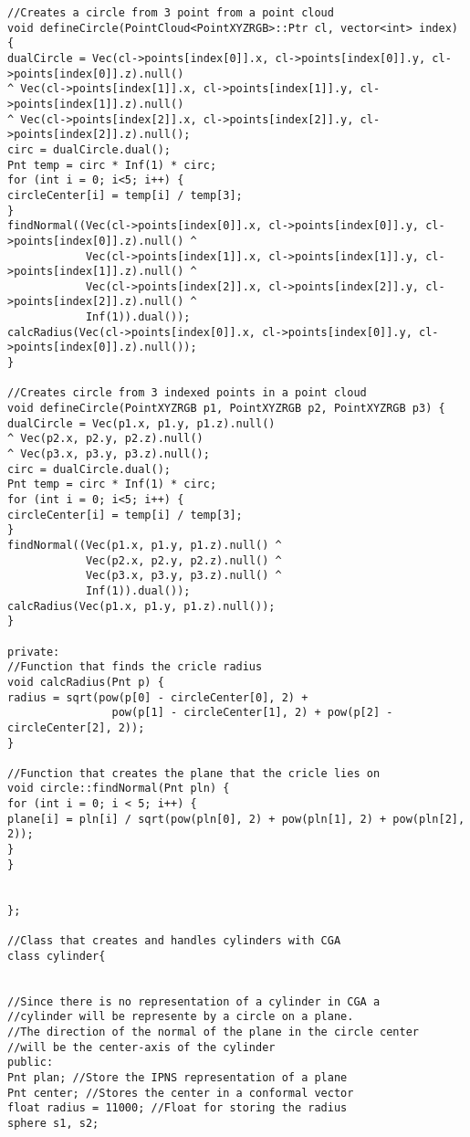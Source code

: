 {\begin{lstlisting}[caption={Archivo objects.h}]
//Creates a circle from 3 point from a point cloud
void defineCircle(PointCloud<PointXYZRGB>::Ptr cl, vector<int> index) {
dualCircle = Vec(cl->points[index[0]].x, cl->points[index[0]].y, cl->points[index[0]].z).null()
^ Vec(cl->points[index[1]].x, cl->points[index[1]].y, cl->points[index[1]].z).null()
^ Vec(cl->points[index[2]].x, cl->points[index[2]].y, cl->points[index[2]].z).null();
circ = dualCircle.dual();
Pnt temp = circ * Inf(1) * circ;
for (int i = 0; i<5; i++) {
circleCenter[i] = temp[i] / temp[3];
}
findNormal((Vec(cl->points[index[0]].x, cl->points[index[0]].y, cl->points[index[0]].z).null() ^ 
			Vec(cl->points[index[1]].x, cl->points[index[1]].y, cl->points[index[1]].z).null() ^
			Vec(cl->points[index[2]].x, cl->points[index[2]].y, cl->points[index[2]].z).null() ^
			Inf(1)).dual());
calcRadius(Vec(cl->points[index[0]].x, cl->points[index[0]].y, cl->points[index[0]].z).null());
}

//Creates circle from 3 indexed points in a point cloud
void defineCircle(PointXYZRGB p1, PointXYZRGB p2, PointXYZRGB p3) {
dualCircle = Vec(p1.x, p1.y, p1.z).null()
^ Vec(p2.x, p2.y, p2.z).null()
^ Vec(p3.x, p3.y, p3.z).null();
circ = dualCircle.dual();
Pnt temp = circ * Inf(1) * circ;
for (int i = 0; i<5; i++) {
circleCenter[i] = temp[i] / temp[3];
}
findNormal((Vec(p1.x, p1.y, p1.z).null() ^ 
			Vec(p2.x, p2.y, p2.z).null() ^ 
			Vec(p3.x, p3.y, p3.z).null() ^ 
			Inf(1)).dual());
calcRadius(Vec(p1.x, p1.y, p1.z).null());
}

private:
//Function that finds the cricle radius
void calcRadius(Pnt p) {
radius = sqrt(pow(p[0] - circleCenter[0], 2) + 
				pow(p[1] - circleCenter[1], 2) + pow(p[2] - circleCenter[2], 2));
}

//Function that creates the plane that the cricle lies on
void circle::findNormal(Pnt pln) {
for (int i = 0; i < 5; i++) {
plane[i] = pln[i] / sqrt(pow(pln[0], 2) + pow(pln[1], 2) + pow(pln[2], 2));
}
}


};

//Class that creates and handles cylinders with CGA
class cylinder{


//Since there is no representation of a cylinder in CGA a 
//cylinder will be represente by a circle on a plane.
//The direction of the normal of the plane in the circle center 
//will be the center-axis of the cylinder
public:
Pnt plan; //Store the IPNS representation of a plane
Pnt center; //Stores the center in a conformal vector
float radius = 11000; //Float for storing the radius
sphere s1, s2;



\end{lstlisting}}
